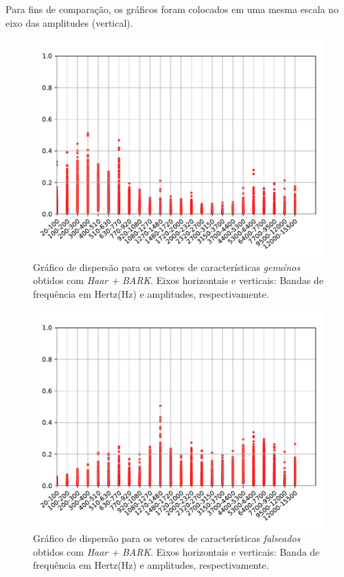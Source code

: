		\par Para fins de comparação, os gráficos foram colocados em uma mesma escala no eixo das amplitudes (vertical).
		\begin{figure}[H]
			\centering
			\includegraphics[scale=.8]{images/results/barkVersusMel/Genuine_haar_Bark.pdf}
			\caption{Gráfico de dispersão para os vetores de características \textit{genuínos} obtidos com \textit{Haar + BARK}. Eixos horizontais e verticais: Bandas de frequência em Hertz(Hz) e amplitudes, respectivamente.}
			\label{fig:livehaarbark}
		\end{figure}
		\begin{figure}[H]
			\centering
			\includegraphics[scale=.8]{images/results/barkVersusMel/Spoofing_haar_Bark.pdf}
			\caption{Gráfico de dispersão para os vetores de características \textit{falseados} obtidos com \textit{Haar + BARK}. Eixos horizontais e verticais: Banda de frequência em Hertz(Hz) e amplitudes, respectivamente.}
			\label{fig:spoofinghaarbark}
		\end{figure}

